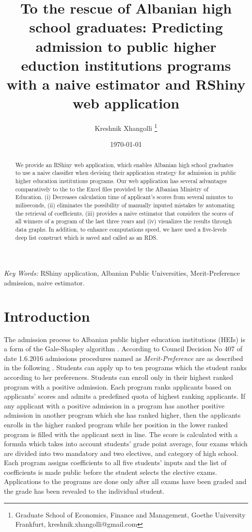 \documentclass{article}
\title{To the rescue of Albanian high school graduates: Predicting admission to public higher eduction institutions programs with a naive estimator and RShiny web application}
\date{\today}
\author{Kreshnik Xhangolli \footnote{Graduate School of Economics, Finance and Management, Goethe University Frankfurt, kreshnik.xhangolli@gmail.com}}
\begin{document}
	\maketitle
	
	\begin{abstract}
		
		We provide an RShiny web application, which enables Albanian high school graduates to use a naive classifier when devising their application strategy for admission in public higher education institutions programs. Our web application has several advantages comparatively to the to the Excel files provided by the Albanian Ministry of Education. (i) Decreases calculation time of applicant's scores from several minutes to miliseconds, (ii) eliminates the possibility of manually inputed mistakes by automating the retrieval of coefficients, (iii) provides a naive estimator that considers the scores of all winners of a program of the last three years and (iv) visualizes the results through data graphs. In addition, to enhance computations speed, we have used a five-levels deep list construct which is saved and called as an RDS.  
		
	\end{abstract}
	
	\vspace{1in}
	
	\textit{Key Words:} RShiny application, Albanian Public Universities, Merit-Preference admission, naive estimator.
	\pagebreak

\section{Introduction}
The admission process to Albanian public higher education institutions (HEIs) is a form of the Gale-Shapley algorithm \cite{gale1962college}. According to Council Decision No 407 of date 1.6.2016 admissions procedures named as \textit{Merit-Preference} are as described in the following \cite{CoM2016}. Students can apply up to ten programs which the student ranks according to her preferences. Students can enroll only in their highest ranked program with a positive admission. Each program ranks applicants based on applicants' scores and admits a predefined quota of highest ranking applicants. If any applicant with a positive admission in a program has another positive admission in another program which she has ranked higher, then the applicants enrolls in the higher ranked program while her position in the lower ranked program is filled with the applicant next in line. The score is calculated with a formula which takes into account students' grade point average, four exams which are divided into two mandatory and two electives, and category of high school. Each program assigns coefficients to all five students' inputs and the list of coefficients is made public before the student selects the elective exams. Applications to the programs are done only after all exams have been graded and the grade has been revealed to the individual student.
\end{document}
